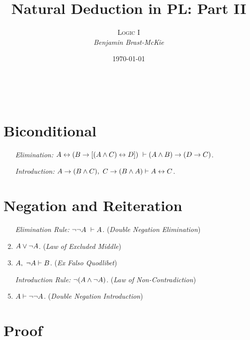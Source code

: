 \documentclass[a4paper, 11pt]{article} %
\title{\textbf{Natural Deduction in PL: Part II}} %
\author{\textsc{Logic I}\\ \em Benjamin Brast-McKie} %
\date{\today} %
\makeatletter
\renewcommand{\maketitle}{
\begin{flushright}
{\LARGE\@title}

\vspace{10pt}

{\@author}
\\ \@date
\end{flushright}

\vspace{20pt}

}
\makeatother
\begin{document}
\maketitle %

\thispagestyle{empty}


\section*{Biconditional}

\begin{enumerate}
  \item[\it Elimination:] $A \leftrightarrow (B \rightarrow [(A \wedge C)\leftrightarrow D])\ \vdash (A\wedge B) \rightarrow (D \rightarrow C)$. 
  \item[\it Introduction:] $A \rightarrow (B \wedge C),\ C \rightarrow (B \wedge A) \vdash A \leftrightarrow C$.
\end{enumerate}






\section*{Negation and Reiteration}

\begin{enumerate}
  \item[\it Elimination Rule:] $\neg\neg A\ \vdash A$. \quad(\textit{Double Negation Elimination})
  \item $A \vee \neg A$. \quad(\textit{Law of Excluded Middle})
  \item $A,\ \neg A \vdash B$. \quad(\textit{Ex Falso Quodlibet})
  \item[\it Introduction Rule:] $\neg(A \wedge \neg A)$. \quad(\textit{Law of Non-Contradiction})
  \item $A \vdash \neg\neg A$. \quad(\textit{Double Negation Introduction}) 
\end{enumerate}






\section*{Proof}
\end{document}
